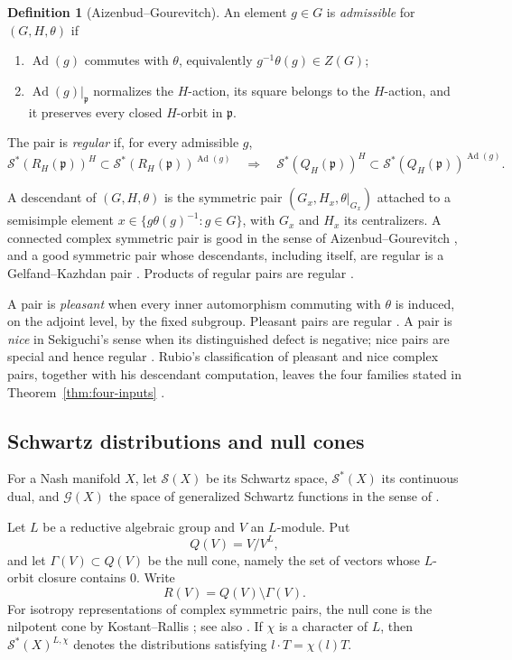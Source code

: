 \documentclass[11pt,reqno]{amsart}
\numberwithin{equation}{section}
\theoremstyle{definition}
\newtheorem{definition}[theorem]{Definition}
\theoremstyle{remark}
\newcommand{\Ad}{\operatorname{Ad}}
\newcommand{\fp}{\mathfrak p}
\newcommand{\cS}{\mathcal S}
\newcommand{\cG}{\mathcal G}
\begin{document}
\begin{definition}[Aizenbud--Gourevitch]\label{def:regularity}
An element $g\in G$ is \emph{admissible} for $(G,H,\theta)$ if
\begin{enumerate}[label=\textup{(\roman*)}]
\item $\Ad(g)$ commutes with $\theta$, equivalently
      $g^{-1}\theta(g)\in Z(G)$;
\item $\Ad(g)|_{\fp}$ normalizes the $H$-action, its square belongs to the
      $H$-action, and it preserves every closed $H$-orbit in $\fp$.
\end{enumerate}
The pair is \emph{regular} if, for every admissible $g$,
\[
 \cS^*(R_H(\fp))^H\subset\cS^*(R_H(\fp))^{\Ad(g)}
 \quad\Longrightarrow\quad
 \cS^*(Q_H(\fp))^H\subset\cS^*(Q_H(\fp))^{\Ad(g)}.
\]
\end{definition}

A descendant of $(G,H,\theta)$ is the symmetric pair
$(G_x,H_x,\theta|_{G_x})$ attached to a semisimple element
$x\in\{g\theta(g)^{-1}:g\in G\}$, with $G_x$ and $H_x$ its centralizers.
A connected complex symmetric pair is good in the sense of
Aizenbud--Gourevitch \cite[Corollary~7.1.7]{AG09}, and a good symmetric pair
whose descendants, including itself, are regular is a Gelfand--Kazhdan pair
\cite[Theorem~7.4.5]{AG09}.  Products of regular pairs are regular
\cite[Proposition~7.4.4]{AG09}.

A pair is \emph{pleasant} when every inner automorphism commuting with $\theta$
is induced, on the adjoint level, by the fixed subgroup.  Pleasant pairs are
regular \cite[Lemma~4.2]{Rubio}.  A pair is \emph{nice} in Sekiguchi's sense
when its distinguished defect is negative; nice pairs are special and hence
regular \cite{Sekiguchi,Aiz13}.  Rubio's classification of pleasant and nice
complex pairs, together with his descendant computation, leaves the four
families stated in Theorem~\ref{thm:four-inputs} \cite[Proposition~6.3]{Rubio}.

\subsection{Schwartz distributions and null cones}
For a Nash manifold $X$, let $\cS(X)$ be its Schwartz space,
$\cS^*(X)$ its continuous dual, and $\cG(X)$ the space of generalized
Schwartz functions in the sense of \cite[Appendix~B]{AG09}.

Let $L$ be a reductive algebraic group and $V$ an $L$-module.  Put
\[
 Q(V)=V/V^L,
\]
and let $\Gamma(V)\subset Q(V)$ be the null cone, namely the set of vectors
whose $L$-orbit closure contains $0$.  Write
\[
 R(V)=Q(V)\setminus\Gamma(V).
\]
For isotropy representations of complex symmetric pairs, the null cone is the
nilpotent cone by Kostant--Rallis \cite{KR}; see also
\cite[Lemma~7.3.8]{AG09}.  If $\chi$ is a character of $L$, then
$\cS^*(X)^{L,\chi}$ denotes the distributions satisfying
$l\cdot T=\chi(l)T$.
\end{document}
